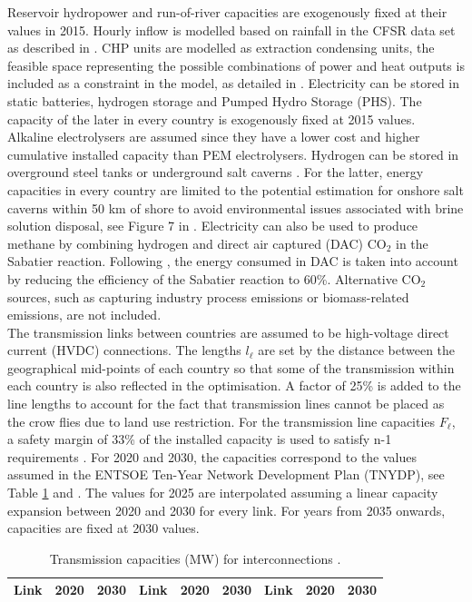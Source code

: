 \documentclass[3p]{elsarticle} %
\begin{document}
Reservoir hydropower and run-of-river capacities are exogenously fixed at their values in 2015. Hourly inflow is modelled based on rainfall in the CFSR data set as described in \cite{Brown_2018}. CHP units are modelled as extraction condensing units, the feasible space representing the possible combinations of power and heat outputs is included as a constraint in the model, as detailed in \cite{Brown_2018}. Electricity can be stored in static batteries, hydrogen storage and Pumped Hydro Storage (PHS). The capacity of the later in every country is exogenously fixed at 2015 values. Alkaline electrolysers are assumed since they have a lower cost \cite{DEA_2019} and higher cumulative installed capacity \cite{Staffell_2019} than PEM electrolysers. Hydrogen can be stored in overground steel tanks or underground salt caverns \cite{Staffell_2019}. For the latter, energy capacities in every country are limited to the potential estimation for onshore salt caverns within 50 km of shore to avoid environmental issues associated with brine solution disposal, see Figure 7 in \cite{Caglayan_2019}. Electricity can also be used to produce methane by combining hydrogen and direct air captured (DAC) CO$_2$ in the Sabatier reaction. Following \cite{Brown_2018}, the energy consumed in DAC is taken into account by reducing the efficiency of the Sabatier reaction to 60\%. Alternative CO$_2$ sources, such as capturing industry process emissions or biomass-related emissions, are not included. \\

The transmission links between countries are assumed to be high-voltage direct current (HVDC) connections. The lengths $l_{\ell}$ are set by the distance between the geographical mid-points of each country so that some of the transmission within each country is also reflected in the optimisation. A factor of 25\% is added to the line lengths to account for the fact that transmission lines cannot be placed as the crow flies due to land use restriction. For the transmission line capacities $F_{\ell}$, a safety margin of 33\% of the installed capacity is used to satisfy n-1 requirements \cite{Brown_2016}. For 2020 and 2030, the capacities correspond to the values assumed in the ENTSOE Ten-Year Network Development Plan (TNYDP), see Table \ref{tab_interconnections} and \cite{TYNDP2016}. The values for 2025 are interpolated assuming a linear capacity expansion between 2020 and 2030 for every link. For years from 2035 onwards, capacities are fixed at 2030 values. \


\begin{table}[!h]
\footnotesize
\centering
\begin{threeparttable}
\caption{Transmission capacities (MW) for interconnections \cite{TYNDP2016}.} \label{tab_interconnections}
\centering

\begin{tabularx}{10.5cm}{lrr|lrr|lrr}
\toprule
Link & 2020 & 2030 & Link & 2020 & 2030 & Link & 2020 & 2030  \\
\midrule

\bottomrule
\end{tabularx}
\end{threeparttable}
\end{table}
\end{document}
